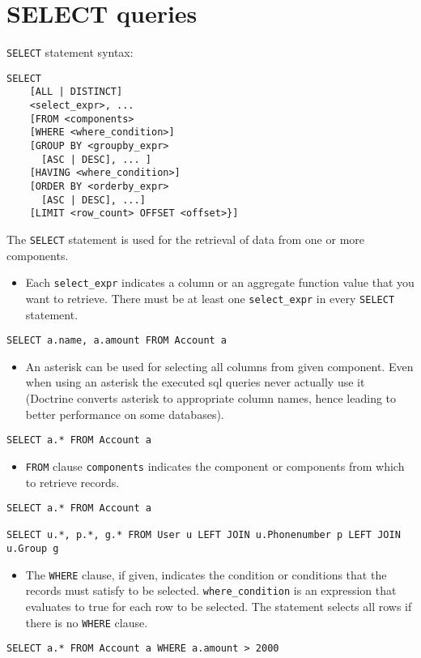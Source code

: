 \documentclass[11pt,a4paper]{report}
\begin{document}
\section{SELECT queries}
\texttt{SELECT} statement syntax:

\begin{verbatim}
SELECT
    [ALL | DISTINCT]
    <select_expr>, ...
    [FROM <components>
    [WHERE <where_condition>]
    [GROUP BY <groupby_expr>
      [ASC | DESC], ... ]
    [HAVING <where_condition>]
    [ORDER BY <orderby_expr>
      [ASC | DESC], ...]
    [LIMIT <row_count> OFFSET <offset>}]
\end{verbatim}

The \texttt{SELECT} statement is used for the retrieval of data from one or more components.

\begin{itemize}
\item{Each \texttt{select\_expr} indicates a column or an aggregate function value that you want to retrieve. There must be at least one \texttt{select\_expr} in every \texttt{SELECT} statement.}
\end{itemize}
\begin{verbatim}
SELECT a.name, a.amount FROM Account a
\end{verbatim}

\begin{itemize}
\item{An asterisk can be used for selecting all columns from given component. Even when using an asterisk the executed sql queries never actually use it (Doctrine converts asterisk to appropriate column names, hence leading to better performance on some databases).}
\end{itemize}
\begin{verbatim}
SELECT a.* FROM Account a
\end{verbatim}

\begin{itemize}
\item{\texttt{FROM} clause \texttt{components} indicates the component or components from which to retrieve records.}
\end{itemize}
\begin{verbatim}
SELECT a.* FROM Account a

SELECT u.*, p.*, g.* FROM User u LEFT JOIN u.Phonenumber p LEFT JOIN u.Group g
\end{verbatim}

\begin{itemize}
\item{The \texttt{WHERE} clause, if given, indicates the condition or conditions that the records must satisfy to be selected. \texttt{where\_condition} is an expression that evaluates to true for each row to be selected. The statement selects all rows if there is no \texttt{WHERE} clause.}
\end{itemize}
\begin{verbatim}
SELECT a.* FROM Account a WHERE a.amount > 2000
\end{verbatim}
\end{document}

